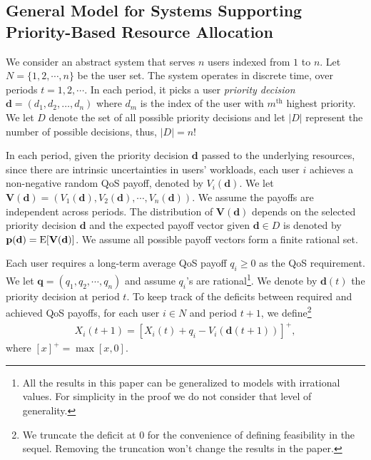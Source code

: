 \documentclass[prodmode,acmtompecs]{acmsmall}
\newcommand{\reqvec}{\mathbf{q}}
\newcommand{\reqscalar}{q}
\newcommand{\fullUserSet}{N}
\newcommand{\myComments}[1]{}
\newif\ifextended
\newcommand{\extendedStart}{\ifextended  \myComments{Extended version: }}
\newcommand{\commentEnd}{\myComments{End}}
\begin{document}
\subsection{General Model for Systems Supporting Priority-Based Resource Allocation} 
\label{subsection_general_payoff_model}
We consider an abstract system that serves $n$ users indexed from $1$ to $n$. Let $\fullUserSet = \{1, 2, \cdots, n\}$ be the user set. The system operates in discrete time, over periods $t = 1, 2, \cdots$. In each period, it picks a user {\em priority decision} $\mathbf{d} = (d_1, d_2, \dots, d_n)$ where $d_m$ is the index of the user with $m^{\text{th}}$ highest priority. We let $D$ denote the set of all possible priority decisions and let $|D|$ represent the number of possible decisions, thus, $|D| = n!$ 

In each period, given the priority decision $\mathbf{d}$ passed to the underlying resources, since there are intrinsic uncertainties in users' workloads, 
each user $i$ achieves a non-negative random QoS payoff, denoted by $V_i(\mathbf{d})$. We let $\mathbf{V}(\mathbf{d}) = (V_1(\mathbf{d}), V_2(\mathbf{d}), \cdots, V_n(\mathbf{d}))$. 
We assume the payoffs are independent across periods. 
The distribution of $\mathbf{V}(\mathbf{d})$ depends on the selected priority decision $\mathbf{d}$ and the expected payoff vector given $\mathbf{d} \in D$ is denoted by $\mathbf{p}(\mathbf{d}) = \operatorname*{\mathrm{E}}[\mathbf{V}(\mathbf{d})]$. We assume all possible payoff vectors form a finite rational set. 
\extendedStart
Moreover, we naturally assume that for each user $i\in \fullUserSet$, there exists a decision $\mathbf{d}$ such that $p_i(\mathbf{d}) > 0$. 
\commentEnd\fi

Each user requires a long-term average QoS payoff $\reqscalar_i \geq 0$ as the QoS requirement. We let $\reqvec = (\reqscalar_1, \reqscalar_2, \cdots, \reqscalar_n)$ and assume $\reqscalar_i$'s are rational\footnote{All the results in this paper can be generalized to models with irrational values. For simplicity in the proof we do not consider that level of generality. }. We denote by $\mathbf{d}(t)$ the priority decision at period $t$. To keep track of the deficits between required and achieved QoS payoffs, for each user $i \in \fullUserSet$ and period $t+1$, we define\footnote{We truncate the deficit at $0$ for the convenience of defining feasibility in the sequel. Removing the truncation won't change the results in the paper. }
\begin{align}
\label{align_deficit_in_general_payoff}
X_i(t+1) = [X_i(t) + \reqscalar_i - V_i(\mathbf{d}(t+1))]^+, 
\end{align}
where $[x]^+ = \max[x, 0]$. 
\end{document}
